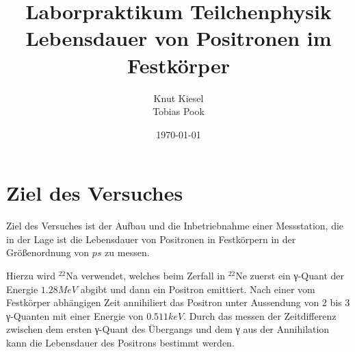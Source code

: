 \documentclass[a4paper,12pt]{article}
\title{Laborpraktikum Teilchenphysik\\ Lebensdauer von Positronen im Festkörper}
\author{Knut Kiesel\\Tobias Pook}
\date{\today}
\begin{document}
\maketitle
\vspace{5cm}
\tableofcontents
\thispagestyle{empty}
\newpage
\setcounter{page}{1}

\section{Ziel des Versuches}
Ziel des Versuches ist der Aufbau und die Inbetriebnahme einer Messstation,
die in der Lage ist die Lebensdauer von Positronen in Festkörpern in der
Größenordnung von $\si{ps}$ zu messen.

Hierzu wird $^{22}$Na verwendet, welches beim Zerfall in $^{22}$Ne
zuerst ein γ-Quant der Energie $1.28\si{MeV}$ abgibt und dann ein Positron emittiert.
Nach einer vom Festkörper abhängigen Zeit annihiliert das Positron unter Aussendung
von 2 bis 3 γ-Quanten mit einer Energie von $0.511\si{keV}$.
Durch das messen der Zeitdifferenz zwischen dem ersten γ-Quant des Übergangs und dem
γ aus der Annihilation kann die Lebensdauer des Positrons bestimmt werden.
\end{document}
